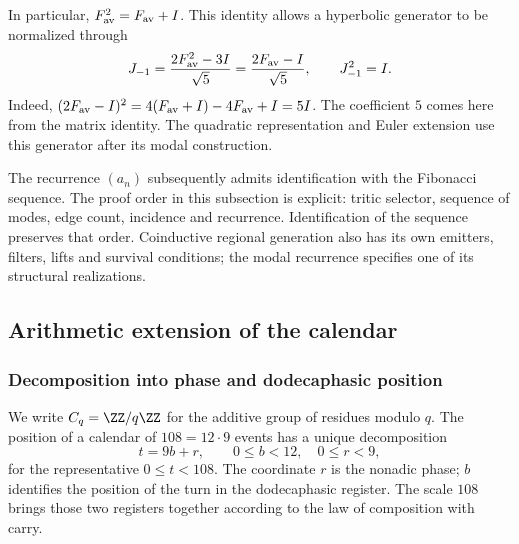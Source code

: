 In particular, $F_{\rm av}^{2}=F_{\rm av}+I$. This identity allows
a hyperbolic generator to be normalized through
\begin{equation}
 J_{-1}=\frac{2F_{\rm av}^{2}-3I}{\sqrt5}
       =\frac{2F_{\rm av}-I}{\sqrt5},
 \qquad J_{-1}^{2}=I.
 \label{eq:cal-generador-hiperbolico}
\end{equation}
Indeed, $(2F_{\rm av}-I)^2=4(F_{\rm av}+I)-4F_{\rm av}+I=5I$.
The coefficient $5$ comes here from the matrix identity. The quadratic
representation and Euler extension use this generator after its
modal construction.

The recurrence $(a_n)$ subsequently admits identification with the
Fibonacci sequence. The proof order in this subsection is explicit:
tritic selector, sequence of modes, edge count, incidence and
recurrence. Identification of the sequence preserves that order.
Coinductive regional generation also has its own emitters, filters,
lifts and survival conditions; the modal recurrence specifies
one of its structural realizations.

\subsection{Arithmetic extension of the calendar}

\subsubsection{Decomposition into phase and dodecaphasic position}

We write $C_q=\ZZ/q\ZZ$ for the additive group of residues modulo $q$.
The position of a calendar of $108=12\cdot9$ events has a
unique decomposition
\[
 t=9b+r,\qquad 0\leq b<12,\quad0\leq r<9,
\]
for the representative $0\leq t<108$. The coordinate $r$ is the nonadic
phase; $b$ identifies the position of the turn in the dodecaphasic
register. The scale $108$ brings those two registers together according to the law of
composition with carry.

